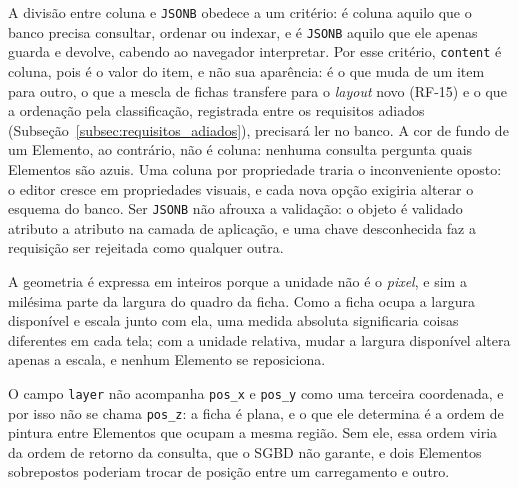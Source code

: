 A divisão entre coluna e \texttt{JSONB} obedece a um critério: é coluna aquilo que o banco precisa consultar, ordenar ou indexar, e é \texttt{JSONB} aquilo que ele apenas guarda e devolve, cabendo ao navegador interpretar. Por esse critério, \texttt{content} é coluna, pois é o valor do item, e não sua aparência: é o que muda de um item para outro, o que a mescla de fichas transfere para o \textit{layout} novo (RF-15) e o que a ordenação pela classificação, registrada entre os requisitos adiados (Subseção~\ref{subsec:requisitos_adiados}), precisará ler no banco. A cor de fundo de um Elemento, ao contrário, não é coluna: nenhuma consulta pergunta quais Elementos são azuis. Uma coluna por propriedade traria o inconveniente oposto: o editor cresce em propriedades visuais, e cada nova opção exigiria alterar o esquema do banco. Ser \texttt{JSONB} não afrouxa a validação: o objeto é validado atributo a atributo na camada de aplicação, e uma chave desconhecida faz a requisição ser rejeitada como qualquer outra.

A geometria é expressa em inteiros porque a unidade não é o \textit{pixel}, e sim a milésima parte da largura do quadro da ficha. Como a ficha ocupa a largura disponível e escala junto com ela, uma medida absoluta significaria coisas diferentes em cada tela; com a unidade relativa, mudar a largura disponível altera apenas a escala, e nenhum Elemento se reposiciona.

O campo \texttt{layer} não acompanha \texttt{pos\_x} e \texttt{pos\_y} como uma terceira coordenada, e por isso não se chama \texttt{pos\_z}: a ficha é plana, e o que ele determina é a ordem de pintura entre Elementos que ocupam a mesma região. Sem ele, essa ordem viria da ordem de retorno da consulta, que o SGBD não garante, e dois Elementos sobrepostos poderiam trocar de posição entre um carregamento e outro.

